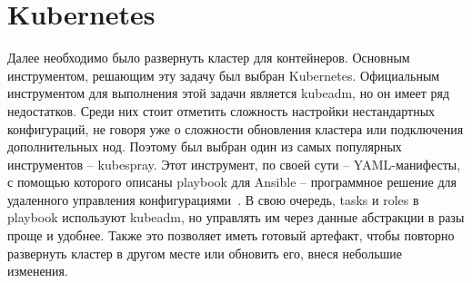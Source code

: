 \section{Kubernetes}
\label{sec:k8s}

Далее необходимо было развернуть кластер для контейнеров. Основным инструментом, решающим эту задачу был выбран Kubernetes. Официальным инструментом для выполнения этой задачи является kubeadm,
но он имеет ряд недостатков. Среди них стоит отметить сложность настройки нестандартных конфигураций, не говоря уже о сложности обновления кластера или подключения дополнительных нод. Поэтому был выбран один из самых популярных инструментов -- kubespray.
Этот инструмент, по своей сути -- YAML-манифесты,
с помощью которого описаны playbook
для Ansible -- программное решение для удаленного управления конфигурациями~\cite{def:ansible}.
В свою очередь, tasks
и roles
в playbook используют kubeadm, но управлять им через данные абстракции в разы проще и удобнее. Также это позволяет иметь готовый артефакт, чтобы повторно развернуть кластер в другом месте или обновить его, внеся небольшие изменения.

